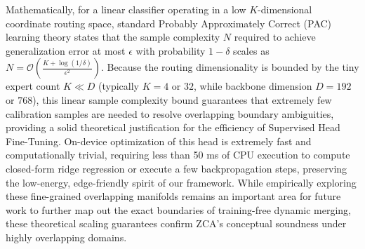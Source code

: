 \begin{itemize}
Mathematically, for a linear classifier operating in a low $K$-dimensional coordinate routing space, standard Probably Approximately Correct (PAC) learning theory states that the sample complexity $N$ required to achieve generalization error at most $\epsilon$ with probability $1-\delta$ scales as $N = \mathcal{O}\left( \frac{K + \log(1/\delta)}{\epsilon^2} \right)$.
Because the routing dimensionality is bounded by the tiny expert count $K \ll D$ (typically $K=4$ or $32$, while backbone dimension $D=192$ or $768$), this linear sample complexity bound guarantees that extremely few calibration samples are needed to resolve overlapping boundary ambiguities, providing a solid theoretical justification for the efficiency of Supervised Head Fine-Tuning.
On-device optimization of this head is extremely fast and computationally trivial, requiring less than 50 ms of CPU execution to compute closed-form ridge regression or execute a few backpropagation steps, preserving the low-energy, edge-friendly spirit of our framework.
While empirically exploring these fine-grained overlapping manifolds remains an important area for future work to further map out the exact boundaries of training-free dynamic merging, these theoretical scaling guarantees confirm ZCA's conceptual soundness under highly overlapping domains.


\end{itemize}
